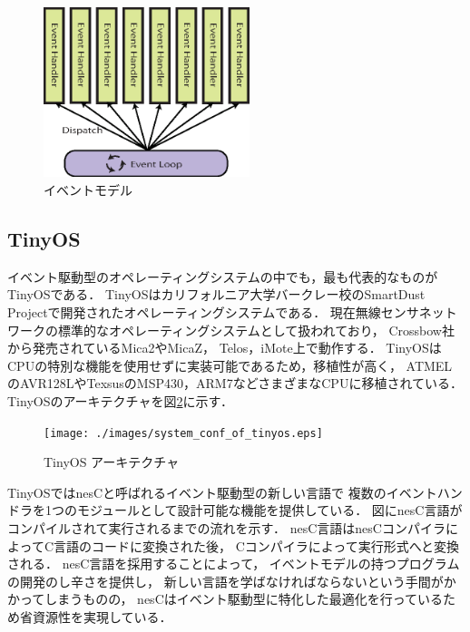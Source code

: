 \begin{figure}[htbp]
 \begin{center}
  \includegraphics[width=60mm]{./images/event_model.eps}
 \end{center}
 \caption{イベントモデル}
 \label{fig:event_model}
\end{figure}


\subsection{TinyOS}
イベント駆動型のオペレーティングシステムの中でも，最も代表的なものが
TinyOS\cite{Hill:2000:SAD:356989.356998}\cite{Levis04tinyos:an}である．
TinyOSはカリフォルニア大学バークレー校のSmartDust Projectで開発されたオペレーティングシステムである．
現在無線センサネットワークの標準的なオペレーティングシステムとして扱われており，
Crossbow社から発売されているMica2やMicaZ\cite{Hill:2002:MWP:623308.624560}，
Telos\cite{Polastre:2005:TEU:1147685.1147744}，iMote\cite{Nachman:2005:IMP:1147685.1147760}上で動作する．
TinyOSはCPUの特別な機能を使用せずに実装可能であるため，移植性が高く，
ATMELのAVR128LやTexsusのMSP430，ARM7などさまざまなCPUに移植されている．
TinyOSのアーキテクチャを図\ref{fig:system_conf_of_tinyos}に示す．

\begin{figure}[htbp]
 \begin{center}
  \texttt{[image: ./images/system\_conf\_of\_tinyos.eps]}
 \end{center}
 \caption{TinyOS アーキテクチャ}
 \label{fig:system_conf_of_tinyos}
\end{figure}

TinyOSではnesC\cite{Gay:2003:NLH:781131.781133}と呼ばれるイベント駆動型の新しい言語で
複数のイベントハンドラを1つのモジュールとして設計可能な機能を提供している．
図にnesC言語がコンパイルされて実行されるまでの流れを示す．
nesC言語はnesCコンパイラによってC言語のコードに変換された後，
Cコンパイラによって実行形式へと変換される．
nesC言語を採用することによって，
イベントモデルの持つプログラムの開発のし辛さを提供し，
新しい言語を学ばなければならないという手間がかかってしまうものの，
nesCはイベント駆動型に特化した最適化を行っているため省資源性を実現している．


